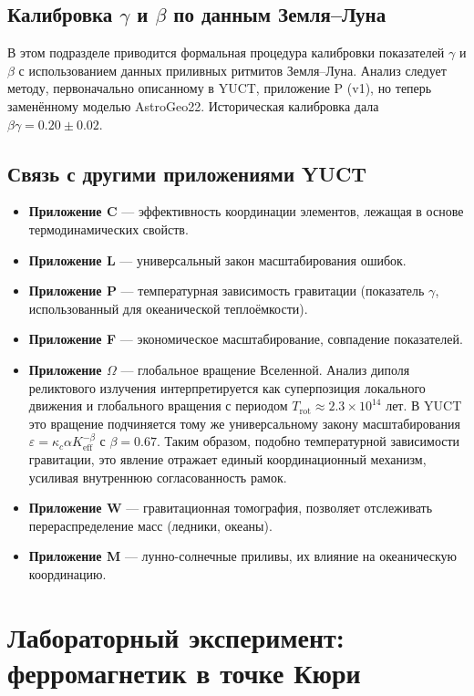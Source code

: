 \documentclass[12pt]{article}
\theoremstyle{remark}
\begin{document}
	\subsection{Калибровка \(\gamma\) и \(\beta\) по данным Земля–Луна}\label{subsec:earth-moon-calibration}
	В этом подразделе приводится формальная процедура калибровки показателей \(\gamma\) и \(\beta\) с использованием данных приливных ритмитов Земля–Луна. Анализ следует методу, первоначально описанному в YUCT, приложение P (v1), но теперь заменённому моделью AstroGeo22. Историческая калибровка дала \(\beta\gamma = 0.20 \pm 0.02\).
	
	\subsection{Связь с другими приложениями YUCT}
	
	\begin{itemize}
		\item \textbf{Приложение C} — эффективность координации элементов, лежащая в основе термодинамических свойств.
		\item \textbf{Приложение L} — универсальный закон масштабирования ошибок.
		\item \textbf{Приложение P} — температурная зависимость гравитации (показатель \(\gamma\), использованный для океанической теплоёмкости).
		\item \textbf{Приложение F} — экономическое масштабирование, совпадение показателей.
		\item \textbf{Приложение \(\Omega\)} — глобальное вращение Вселенной. Анализ диполя реликтового излучения интерпретируется как суперпозиция локального движения и глобального вращения с периодом \(T_{\mathrm{rot}} \approx 2.3\times10^{14}\) лет. В YUCT это вращение подчиняется тому же универсальному закону масштабирования \(\varepsilon = \kappa_c \alpha K_{\mathrm{eff}}^{-\beta}\) с \(\beta = 0.67\). Таким образом, подобно температурной зависимости гравитации, это явление отражает единый координационный механизм, усиливая внутреннюю согласованность рамок.
		\item \textbf{Приложение W} — гравитационная томография, позволяет отслеживать перераспределение масс (ледники, океаны).
		\item \textbf{Приложение M} — лунно-солнечные приливы, их влияние на океаническую координацию.
	\end{itemize}
	
	\section{Лабораторный эксперимент: ферромагнетик в точке Кюри}
	\label{sec:lab}
	
\end{document}
